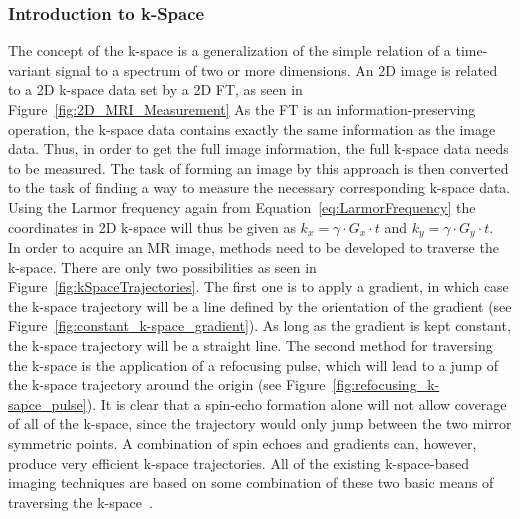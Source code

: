 \subsubsection{Introduction to k-Space}
The concept of the k-space is a generalization of the simple relation of a time-variant signal to a spectrum of two or more dimensions. An 2D image is related to a 2D k-space data set by a 2D FT, as seen in Figure~\ref{fig:2D_MRI_Measurement}
As the FT is an information-preserving operation, the k-space data contains exactly the same information as the image data. Thus, in order to get the full image information, the full k-space data needs to be measured. The task of forming an image by this approach is then converted to the task of finding a way to measure the necessary corresponding k-space data. 
Using the Larmor frequency again from Equation~\ref{eq:LarmorFrequency} the coordinates in 2D k-space will thus be given as $k_x = \gamma \cdot G_x \cdot t$ and $k_y = \gamma \cdot G_y \cdot t$. \\
In order to acquire an MR image, methods need to be developed 
to traverse the k-space.
There are only two possibilities as seen in Figure~\ref{fig:kSpaceTrajectories}. The first one is to apply a gradient, in which case the k-space trajectory will be a line defined by the orientation of the gradient (see Figure~\ref{fig:constant_k-space_gradient}). As long as the gradient is kept constant, the k-space trajectory will be a straight line. 
The second method for traversing the k-space is the application of a refocusing pulse, which will lead to a jump of the k-space trajectory around the origin (see Figure~\ref{fig:refocusing_k-sapce_pulse}). It is clear that a spin-echo formation alone will not allow coverage of all of the k-space, since the trajectory would only jump between the two mirror symmetric points. A combination of spin echoes and gradients can, however, produce very efficient k-space trajectories. All of the existing k-space-based imaging techniques are based on some combination of these two basic means of traversing the k-space~\cite{SamplingStrategies}. \\
